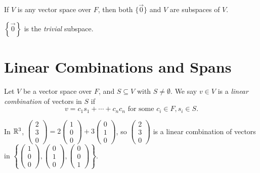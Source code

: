 \begin{exmp}
    If $V$ is any vector space over $F$, then both $\{\vec{0}\}$ and $V$ are subspaces of $V$.
\end{exmp}

\begin{defn}
    $\left\{\vec{0}\right\}$ is the \emph{trivial} subspace.
\end{defn}

\section{Linear Combinations and Spans}

\begin{defn}
    Let $V$ be a vector space over $F$, and $S \subseteq V$ with $S \neq \emptyset$. We say $v \in V$ is a \emph{linear combination} of vectors in $S$ if \[v = c_1s_1 + \cdots + c_nc_n \textrm{ for some } c_i \in F, s_i \in S.\]
\end{defn}

\begin{exmp}
    In $\mathbb{R}^3$, $\begin{pmatrix}
            2 \\ 3 \\ 0
        \end{pmatrix} = 2\begin{pmatrix}
            1 \\ 0 \\ 0
        \end{pmatrix} + 3\begin{pmatrix}
            0 \\ 1 \\ 0
        \end{pmatrix}$, so $\begin{pmatrix}
            2 \\ 3 \\ 0
        \end{pmatrix}$ is a linear combination of vectors in $\left\{\begin{pmatrix}
            1 \\ 0 \\ 0
        \end{pmatrix},\begin{pmatrix}
            0 \\ 1 \\ 0
        \end{pmatrix},\begin{pmatrix}
            0 \\ 0 \\ 1
        \end{pmatrix}\right\}$.
\end{exmp}


